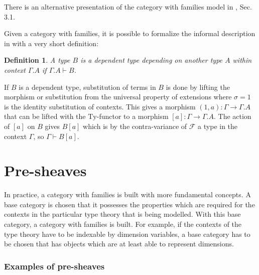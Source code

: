 \documentclass[12pt,a4paper,twoside,xetex]{book} %
\newcommand{\keyword}[1]{\emph{#1}\index{#1}}
\newtheorem{definition}[theorem]{Definition}
\begin{document}
There is an alternative presentation of the category with families model in 
\cite{Orton2019}, Sec. 3.1.

Given a category with families, it is possible to formalize the informal 
description in  with a very short definition:

\begin{definition}\label{depmodel}
A type $B$ is a \keyword{dependent type} depending on another type $A$ within 
context $\Gamma.A$ if $\Gamma.A \vdash B$.
\end{definition}

If $B$ is a dependent type, substitution of terms in $B$ is done by lifting the 
morphism or substitution from the universal property of extensions where 
$\sigma = 1$ is the identity substitution of contexts. This gives a morphism 
$\left(1,a\right):\Gamma\rightarrow\Gamma.A$ that can be lifted with the 
$\text{Ty}$-functor to a morphism 
$\left[a\right]:\Gamma\rightarrow\Gamma.A$. The action of $\left[a\right]$ on 
$B$ gives $B\left[a\right]$ which is by the contra-variance of $\mathcal{F}$ a 
type in the context $\Gamma$, so $\Gamma\vdash B[a]$.



\section{Pre-sheaves}

In practice, a category with families is built with more fundamental concepts. 
A base category is chosen that it possesses the properties which are required  for the contexts in the particular type theory that is being modelled. With this 
base category, a category with families is built. For example, if the 
contexts of the type theory have to be indexable by dimension variables, a base 
category has to be chosen that has objects which are at least able to represent dimensions.

\subsubsection{Examples of pre-sheaves}\label{pre-sheafexs}
\end{document}

